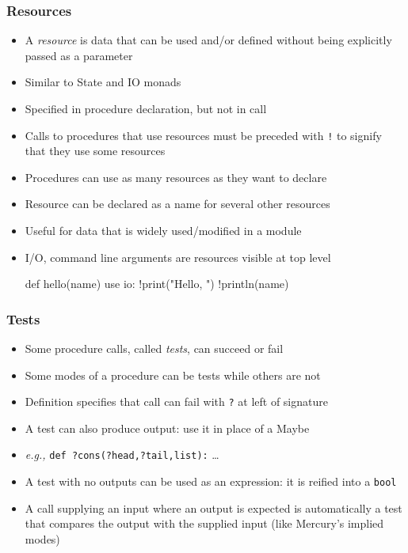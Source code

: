 \documentclass[12pt]{beamer}
\begin{document}
\begin{frame}[fragile]
\frametitle{Resources}
\begin{itemize}
\item A \emph{resource} is data that can be used and/or defined
  without being explicitly passed as a parameter
\item Similar to State and IO monads
\item Specified in procedure declaration, but not in call
\item Calls to procedures that use resources must be preceded with
  \texttt{!} to signify that they use some resources
\item Procedures can use as many resources as they want to declare
\item Resource can be declared as a name for several other resources
\item Useful for data that is widely used/modified in a module
\item I/O, command line arguments are resources visible at top level
  \begin{semiverbatim}
def hello(name) use io:
    !print("Hello, ")
    !println(name)
  \end{semiverbatim}
\end{itemize}
\end{frame}


\begin{frame}[fragile]
\frametitle{Tests}
\begin{itemize}
\item Some procedure calls, called \emph{tests}, can succeed or fail
\item Some modes of a procedure can be tests while others are not
\item Definition specifies that call can fail with \texttt{?} at left
  of signature
\item A test can also produce output: use it in place of a Maybe
\item \emph{e.g.,} \texttt{def ?cons(?head,?tail,list):} \ldots
\item A test with no outputs can be used as an expression:  it is
  reified into a \texttt{bool}
\item A call supplying an input where an output is expected is
  automatically a test that compares the output with the supplied input
(like Mercury's implied modes)
\end{itemize}
\end{frame}
\end{document}
